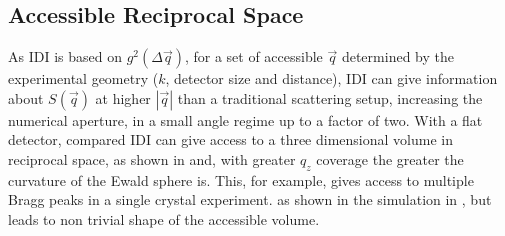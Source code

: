 \subsection{Accessible Reciprocal Space}

	As IDI is based on $g^2(\Delta \vec{q})$, for a set of accessible $\vec{q}$ determined by the experimental geometry ($k$, detector size and distance), IDI can give information about $S(\vec{q})$ at higher $\left|\vec{q}\right|$ than a traditional scattering setup, increasing the numerical aperture, in a small angle regime up to a factor of two. With a flat detector, compared  IDI can give access to a three dimensional volume in reciprocal space, as shown in  and, with greater $q_z$ coverage the greater the curvature of the Ewald sphere is. This, for example, gives access to multiple Bragg peaks in a single crystal experiment. 
	 as shown in the simulation in , but leads to non trivial shape of the accessible volume. 

